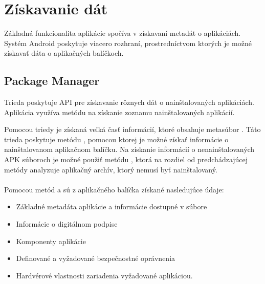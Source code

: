 \section{Získavanie dát}
Základná funkcionalita aplikácie spočíva v získavaní metadát o aplikáciách. Systém Android poskytuje viacero rozhraní, prostredníctvom ktorých je možné získavať dáta o aplikačných balíčkoch.

\subsection{Package Manager}
Trieda  poskytuje API pre získavanie rôznych dát o nainštalovaných aplikáciách. Aplikácia  využíva metódu  na získanie zoznamu nainštalovaných aplikácií. 

Pomocou triedy  je získaná veľká časť informácií, ktoré obsahuje metasúbor . Táto trieda poskytuje metódu , pomocou ktorej je možné získať informácie o nainštalovanom aplikačnom balíčku. Na získanie informácií o nenainštalovaných APK súboroch je možné použiť metódu , ktorá na rozdiel od predchádzajúcej metódy analyzuje aplikačný archív, ktorý nemusí byť nainštalovaný.
\\\\
\noindent Pomocou metód  a  sú z aplikačného balíčka získané nasledujúce údaje:
\begin{itemize}
	\item Základné metadáta aplikácie a informácie dostupné v súbore 
	\item Informácie o digitálnom podpise
	\item Komponenty aplikácie
	\item Definované a vyžadované bezpečnostné oprávnenia
	\item Hardvérové vlastnosti zariadenia vyžadované aplikáciou.
\end{itemize}

